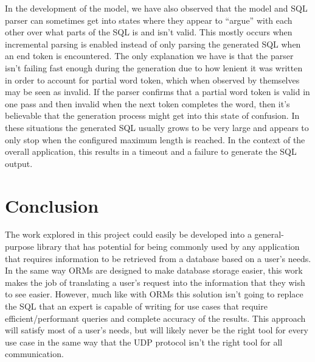 \documentclass[11pt]{article}
\begin{document}
In the development of the model, we have also observed that the model and SQL parser can sometimes get into states where they appear to ``argue'' with each other over what parts of the SQL is and isn't valid. This mostly occurs when incremental parsing is enabled instead of only parsing the generated SQL when an end token is encountered. The only explanation we have is that the parser isn't failing fast enough during the generation due to how lenient it was written in order to account for partial word token, which when observed by themselves may be seen as invalid. If the parser confirms that a partial word token is valid in one pass and then invalid when the next token completes the word, then it's believable that the generation process might get into this state of confusion. In these situations the generated SQL usually grows to be very large and appears to only stop when the configured maximum length is reached. In the context of the overall application, this results in a timeout and a failure to generate the SQL output.







\section{Conclusion}


The work explored in this project could easily be developed into a general-purpose library that has potential for being commonly used by any application that requires information to be retrieved from a database based on a user's needs. In the same way ORMs are designed to make database storage easier, this work makes the job of translating a user's request into the information that they wish to see easier. However, much like with ORMs this solution isn't going to replace the SQL that an expert is capable of writing for use cases that require efficient/performant queries and complete accuracy of the results. This approach will satisfy most of a user's needs, but will likely never be the right tool for every use case in the same way that the UDP protocol isn't the right tool for all communication.
\end{document}
